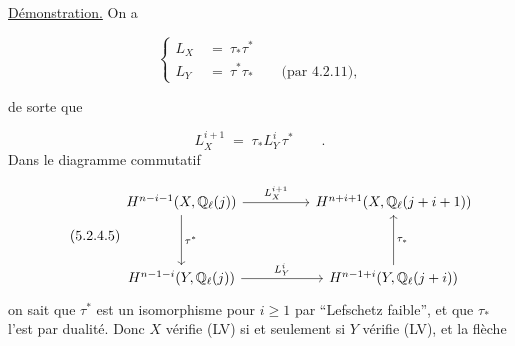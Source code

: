 \underline{Démonstration.}  On a

\begin{equation}\tag{5.2.4.3}
\left\{
\begin{aligned}
L_X &\ =\ \tau_*\tau^* \\[4ex]
L_Y &\ =\ \tau^*\tau_* \qquad \text{(par 4.2.11),}
\end{aligned}
\right. 
\end{equation}


 de sorte que

\begin{equation}\tag{5.2.4.4}
L_X^{i+1} \;=\; \tau_* L_Y^i \, \tau^* \qquad .
\end{equation}
Dans le diagramme commutatif

\begin{equation}\tag{5.2.4.5}
\begin{tikzcd}[column sep=huge, row sep=huge]
H^{n-i-1}(X,\mathbb{Q}_\ell(j)) \arrow[r, "L_X^{i+1}"] \arrow[d, "\tau^*"] & H^{n+i+1}(X,\mathbb{Q}_\ell(j+i+1)) \\
H^{n-1-i}(Y,\mathbb{Q}_\ell(j)) \arrow[r, "L_Y^i"] & H^{n-1+i}(Y,\mathbb{Q}_\ell(j+i)) \arrow[u, "\tau_*"']
\end{tikzcd}
\end{equation}
on sait que $\tau^*$ est un isomorphisme pour $i \geq 1$ par ``Lefschetz faible'', et que $\tau_*$ l'est par dualité. Donc $X$ vérifie (LV) si et seulement si $Y$ vérifie (LV), et la flèche

